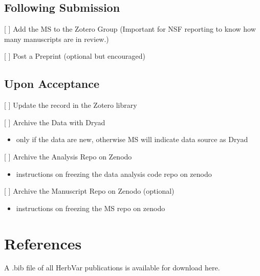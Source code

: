 \documentclass[
  letterpaper,
  oneside,
  open=any]{scrbook}
\providecommand{\tightlist}{%
  \setlength{\itemsep}{0pt}\setlength{\parskip}{0pt}}\usepackage{longtable,booktabs,array}
\begin{document}
\section{Following Submission}\label{following-submission}

{[} {]} Add the MS to the Zotero Group (Important for NSF reporting to
know how many manuscripts are in review.)

{[} {]} Post a Preprint (optional but encouraged)

\section{Upon Acceptance}\label{upon-acceptance}

{[} {]} Update the record in the Zotero library

{[} {]} Archive the Data with Dryad

\begin{itemize}
\tightlist
\item
  only if the data are new, otherwise MS will indicate data source as
  Dryad
\end{itemize}

{[} {]} Archive the Analysis Repo on Zenodo

\begin{itemize}
\tightlist
\item
  instructions on freezing the data analysis code repo on zenodo
\end{itemize}

{[} {]} Archive the Manuscript Repo on Zenodo (optional)

\begin{itemize}
\tightlist
\item
  instructions on freezing the MS repo on zenodo
\end{itemize}


\chapter*{References}\label{references}


A .bib file of all HerbVar publications is available for download here.
\end{document}

